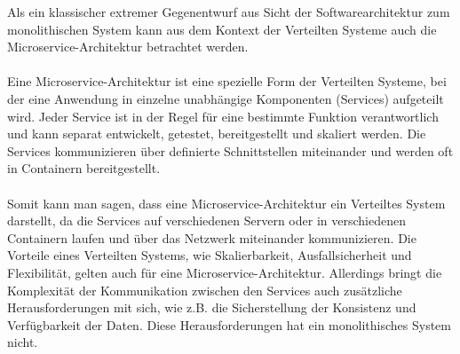 Als ein klassischer extremer Gegenentwurf aus Sicht der Softwarearchitektur zum monolithischen System kann aus dem Kontext der Verteilten Systeme auch die Microservice-Architektur\cite{fowler2014microservices} betrachtet werden.
\\\\
Eine Microservice-Architektur ist eine spezielle Form der Verteilten Systeme, bei der eine Anwendung in einzelne unabhängige Komponenten (Services) aufgeteilt wird. Jeder Service ist in der Regel für eine bestimmte Funktion verantwortlich und kann separat entwickelt, getestet, bereitgestellt und skaliert werden. Die Services kommunizieren über definierte Schnittstellen miteinander und werden oft in Containern bereitgestellt.
\\\\
Somit kann man sagen, dass eine Microservice-Architektur ein Verteiltes System darstellt, da die Services auf verschiedenen Servern oder in verschiedenen Containern laufen und über das Netzwerk miteinander kommunizieren. Die Vorteile eines Verteilten Systems, wie Skalierbarkeit, Ausfallsicherheit und Flexibilität, gelten auch für eine Microservice-Architektur. Allerdings bringt die Komplexität der Kommunikation zwischen den Services auch zusätzliche Herausforderungen mit sich, wie z.B. die Sicherstellung der Konsistenz und Verfügbarkeit der Daten. Diese Herausforderungen hat ein monolithisches System nicht.


